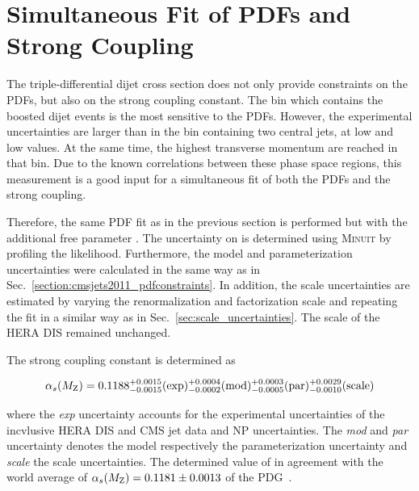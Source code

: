 \section{Simultaneous Fit of PDFs and Strong Coupling}

The triple-differential dijet cross section does not only provide constraints on
the PDFs, but also on the strong coupling constant. The bin which contains the
boosted dijet events is the most sensitive to the PDFs. However, the
experimental uncertainties are larger than in the bin containing two central
jets, \ie at low \yboost and low \ystar values. At the same time, the highest
transverse momentum are reached in that bin. Due to the known correlations
between these phase space regions, this measurement is a good input for a
simultaneous fit of both the PDFs and the strong coupling. 

Therefore, the same PDF fit as in the previous section is performed but with the
additional free parameter \as. The uncertainty on \as is determined using
\textsc{Minuit} by profiling the likelihood. Furthermore, the model and
parameterization uncertainties were calculated in the same way as in
Sec.~\ref{section:cmsjets2011_pdfconstraints}. In addition, the scale
uncertainties are estimated by varying the renormalization and factorization
scale and repeating the fit in a similar way as in
Sec.~\ref{sec:scale_uncertainties}. The scale of the HERA DIS remained
unchanged. 

The strong coupling constant \asmz is determined as

\begin{equation*}
  \alpha_{s}(M_\mathrm{Z}) = 0.1188_{-0.0015}^{+0.0015}(\mathrm{exp})_{-0.0002}^{+0.0004}(\mathrm{mod})_{-0.0005}^{+0.0003}(\mathrm{par})_{-0.0010}^{+0.0029}(\mathrm{scale})
\end{equation*}

where the \emph{exp} uncertainty accounts for the experimental uncertainties of
the incvlusive HERA DIS and CMS jet data and NP uncertainties. The \emph{mod}
and \emph{par} uncertainty denotes the model respectively the parameterization
uncertainty and \emph{scale} the scale uncertainties.  The determined value of
\asmz in agreement with the world average of $\alpha_{s}(M_\mathrm{Z})=0.1181\pm 0.0013$ of the
PDG~\cite{Agashe:2014kda}.
